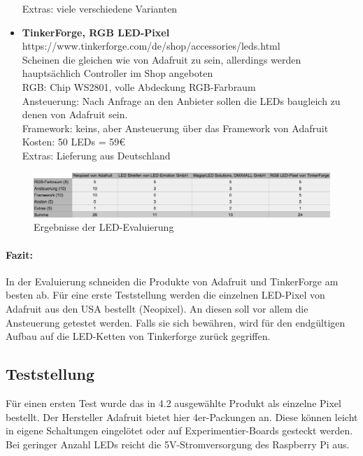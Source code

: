 \begin{itemize}
Extras: viele verschiedene Varianten
\item \textbf{TinkerForge, RGB LED-Pixel} \\
https://www.tinkerforge.com/de/shop/accessories/leds.html \\
Scheinen die gleichen wie von Adafruit zu sein, allerdings werden hauptsächlich Controller im Shop angeboten \\
RGB: Chip WS2801, volle Abdeckung RGB-Farbraum \\
Ansteuerung: Nach Anfrage an den Anbieter sollen die LEDs baugleich zu denen von Adafruit sein.  \\
Framework: keins, aber Ansteuerung über das Framework von Adafruit \\
Kosten: 50 LEDs = 59€ \\
Extras: Lieferung aus Deutschland
\end{itemize}

\begin{figure}[h]
\begin{minipage}{\textwidth}
            \centering
            \includegraphics[width=\textwidth]{./data/evaluierung-led.png}
            \caption{Ergebnisse der LED-Evaluierung}
\end{minipage}
\end{figure}
\paragraph{Fazit:}
In der Evaluierung schneiden die Produkte von Adafruit und TinkerForge am besten ab. Für eine erste Teststellung werden die einzelnen LED-Pixel von Adafruit aus den USA bestellt (Neopixel). An diesen soll vor allem die Ansteuerung getestet werden. Falls sie sich bewähren, wird für den endgültigen Aufbau auf die LED-Ketten von Tinkerforge zurück gegriffen. 

\subsection{Teststellung}
Für einen ersten Test wurde das in 4.2 ausgewählte Produkt als einzelne Pixel bestellt. Der Hersteller Adafruit bietet hier 4er-Packungen an. Diese können leicht in eigene Schaltungen eingelötet oder auf Experimentier-Boards gesteckt werden. Bei geringer Anzahl LEDs reicht die 5V-Stromversorgung des Raspberry Pi aus. 
